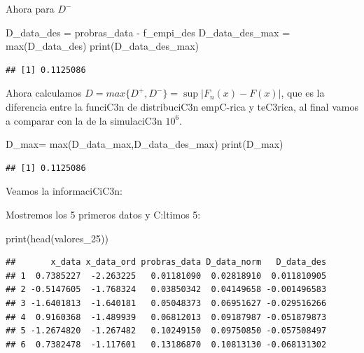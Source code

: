 \documentclass[
]{article}
\newenvironment{Shaded}{\begin{snugshade}}{\end{snugshade}}
\newcommand{\FunctionTok}[1]{\textcolor[rgb]{0.00,0.00,0.00}{#1}}
\newcommand{\NormalTok}[1]{#1}
\newcommand{\OtherTok}[1]{\textcolor[rgb]{0.56,0.35,0.01}{#1}}
\newcommand{\SpecialCharTok}[1]{\textcolor[rgb]{0.00,0.00,0.00}{#1}}
\begin{document}
Ahora para \(D^{-}\)

\begin{Shaded}
\begin{Highlighting}[]
\NormalTok{D\_data\_des }\OtherTok{=}\NormalTok{ probras\_data }\SpecialCharTok{{-}}\NormalTok{ f\_empi\_des}
\NormalTok{D\_data\_des\_max }\OtherTok{=} \FunctionTok{max}\NormalTok{(D\_data\_des)}
\FunctionTok{print}\NormalTok{(D\_data\_des\_max)}
\end{Highlighting}
\end{Shaded}

\begin{verbatim}
## [1] 0.1125086
\end{verbatim}

Ahora calculamos \(D = max \{D^{+},D^{-} \}= \sup |F_{n}(x) - F(x) |\),
que es la diferencia entre la funciC3n de distribuciC3n empC-rica y
teC3rica, al final vamos a comparar con la de la simulaciC3n \(10^{6}\).

\begin{Shaded}
\begin{Highlighting}[]
\NormalTok{D\_max}\OtherTok{=} \FunctionTok{max}\NormalTok{(D\_data\_max,D\_data\_des\_max)}
\FunctionTok{print}\NormalTok{(D\_max)}
\end{Highlighting}
\end{Shaded}

\begin{verbatim}
## [1] 0.1125086
\end{verbatim}

Veamos la informaciCiC3n:

Mostremos los 5 primeros datos y C:ltimos 5:

\begin{Shaded}
\begin{Highlighting}[]
\FunctionTok{print}\NormalTok{(}\FunctionTok{head}\NormalTok{(valores\_25))}
\end{Highlighting}
\end{Shaded}

\begin{verbatim}
##       x_data x_data_ord probras_data D_data_norm   D_data_des
## 1  0.7385227  -2.263225   0.01181090  0.02818910  0.011810905
## 2 -0.5147605  -1.768324   0.03850342  0.04149658 -0.001496583
## 3 -1.6401813  -1.640181   0.05048373  0.06951627 -0.029516266
## 4  0.9160368  -1.489939   0.06812013  0.09187987 -0.051879873
## 5 -1.2674820  -1.267482   0.10249150  0.09750850 -0.057508497
## 6  0.7382478  -1.117601   0.13186870  0.10813130 -0.068131302
\end{verbatim}
\end{document}
